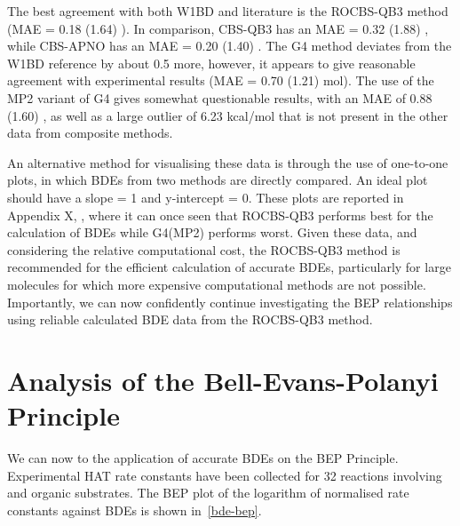 
The best agreement with both W1BD and literature is the ROCBS-QB3 method (MAE = 0.18 (1.64) \kcalmol). In comparison, CBS-QB3 has an MAE = 0.32 (1.88) \kcalmol, while CBS-APNO has an MAE = 0.20 (1.40) \kcalmol.  The G4 method deviates from the W1BD reference by about 0.5 \kcalmol more, however, it appears to give reasonable agreement with experimental results (MAE = 0.70 (1.21) mol). The use of the MP2 variant of G4 gives somewhat questionable results, with an MAE of 0.88 (1.60) \kcalmol, as well as a large outlier of 6.23 kcal/mol that is not present in the other data from composite methods.

An alternative method for visualising these data is through the use of one-to-one plots, in which BDEs from two methods are directly compared. An ideal plot should have a slope = 1 and y-intercept = 0. These plots are reported in Appendix X, , where it can once seen that ROCBS-QB3 performs best for the calculation of BDEs while G4(MP2) performs worst. Given these data, and considering the relative computational cost, the ROCBS-QB3 method is recommended for the efficient calculation of accurate BDEs, particularly for large molecules for which more expensive computational methods are not possible. Importantly, we can now confidently continue investigating the BEP relationships using reliable calculated BDE data from the ROCBS-QB3 method.

\section{Analysis of the Bell-Evans-Polanyi Principle}

We can now to the application of accurate BDEs on the BEP Principle. Experimental HAT rate constants have been collected for 32 reactions involving \cumo and organic substrates. The BEP plot of the logarithm of normalised rate constants against BDEs is shown in~\ref{bde-bep}.

